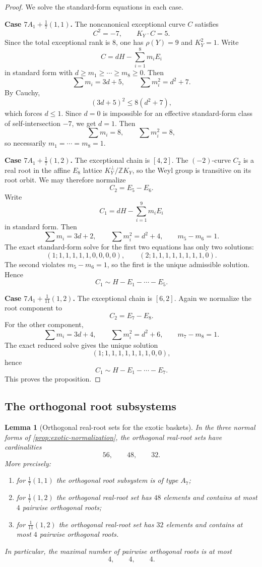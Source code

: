 \documentclass[11pt]{article}
\newtheorem{lemma}[theorem]{Lemma}
\theoremstyle{definition}
\newcommand{\Zbb}{\mathbb Z}
\begin{document}
\begin{proof}
We solve the standard-form equations in each case.

\medskip
\noindent
\textbf{Case $7A_1+\frac17(1,1)$.}
The noncanonical exceptional curve $C$ satisfies
\[
C^2=-7,\qquad K_Y\cdot C=5.
\]
Since the total exceptional rank is $8$, one has $\rho(Y)=9$ and $K_Y^2=1$. Write
\[
C=dH-\sum_{i=1}^8m_iE_i
\]
in standard form with $d\ge m_1\ge \cdots\ge m_8\ge 0$. Then
\[
\sum m_i=3d+5,\qquad \sum m_i^2=d^2+7.
\]
By Cauchy,
\[
(3d+5)^2\le 8(d^2+7),
\]
which forces $d\le 1$. Since $d=0$ is impossible for an effective standard-form class of self-intersection $-7$, we get $d=1$. Then
\[
\sum m_i=8,\qquad \sum m_i^2=8,
\]
so necessarily $m_1=\cdots=m_8=1$.

\medskip
\noindent
\textbf{Case $7A_1+\frac17(1,2)$.}
The exceptional chain is $[4,2]$. The $(-2)$-curve $C_2$ is a real root in the affine $E_8$ lattice $K_Y^{\perp}/\Zbb K_Y$, so the Weyl group is transitive on its root orbit. We may therefore normalize
\[
C_2=E_5-E_6.
\]
Write
\[
C_1=dH-\sum_{i=1}^9m_iE_i
\]
in standard form. Then
\[
\sum m_i=3d+2,\qquad \sum m_i^2=d^2+4,\qquad m_5-m_6=1.
\]
The exact standard-form solve for the first two equations has only two solutions:
\[
(1;1,1,1,1,1,0,0,0,0),\qquad (2;1,1,1,1,1,1,1,1,0).
\]
The second violates $m_5-m_6=1$, so the first is the unique admissible solution. Hence
\[
C_1\sim H-E_1-\cdots-E_5.
\]

\medskip
\noindent
\textbf{Case $7A_1+\frac1{11}(1,2)$.}
The exceptional chain is $[6,2]$. Again we normalize the root component to
\[
C_2=E_7-E_8.
\]
For the other component,
\[
\sum m_i=3d+4,\qquad \sum m_i^2=d^2+6,\qquad m_7-m_8=1.
\]
The exact reduced solve gives the unique solution
\[
(1;1,1,1,1,1,1,1,0,0),
\]
hence
\[
C_1\sim H-E_1-\cdots-E_7.
\]
This proves the proposition.
\end{proof}

\subsection{The orthogonal root subsystems}

\begin{lemma}[Orthogonal real-root sets for the exotic baskets]\label{lem:exotic-root-types}
In the three normal forms of \cref{prop:exotic-normalization}, the orthogonal real-root sets have cardinalities
\[
56,\qquad 48,\qquad 32.
\]
More precisely:
\begin{enumerate}[label=\textup{(\roman*)},leftmargin=2.5em]
    \item for $\frac17(1,1)$ the orthogonal root subsystem is of type $A_7$;
    \item for $\frac17(1,2)$ the orthogonal real-root set has $48$ elements and contains at most $4$ pairwise orthogonal roots;
    \item for $\frac1{11}(1,2)$ the orthogonal real-root set has $32$ elements and contains at most $4$ pairwise orthogonal roots.
\end{enumerate}
In particular, the maximal number of pairwise orthogonal roots is at most
\[
4,\qquad 4,\qquad 4.
\]
\end{lemma}
\end{document}
